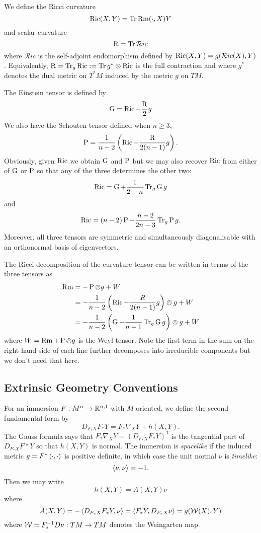 \documentclass[a4paper, 12pt]{amsart}
\begin{document}
We define the Ricci curvature
\[
\operatorname{Ric}(X, Y) = \operatorname{Tr} \operatorname{Rm}(\cdot, X) Y
\]
and scalar curvature
\[
\operatorname{R} = \operatorname{Tr} \mathcal{R}ic
\]
where \(\mathcal{R}ic\) is the self-adjoint endomorphism defined by \(\operatorname{Ric}(X, Y) = g(\mathcal{R}ic(X), Y)\). Equivalently, \(\operatorname{R} = \operatorname{Tr}_g \operatorname{Ric} := \operatorname{Tr} g^{\ast} \otimes \operatorname{Ric}\) is the full contraction and where \(g^{\ast}\) denotes the dual metric on \(T^{\ast}M\) induced by the metric \(g\) on \(TM\).

The Einstein tensor is defined by
\[
\operatorname{G} = \operatorname{Ric} - \frac{\operatorname{R}}{2} g
\]
We also have the Schouten tensor defined when \(n \geq 3\),
\[
\operatorname{P} = \frac{1}{n-2} \left(\operatorname{Ric} - \frac{\operatorname{R}}{2(n-1)}g \right).
\]
Obviously, given \(\operatorname{Ric}\) we obtain \(\operatorname{G}\) and \(\operatorname{P}\) but we may also recover \(\operatorname{Ric}\) from either of \(\operatorname{G}\) or \(\operatorname{P}\) so that any of the three determines the other two:
\[
\operatorname{Ric} = \operatorname{G} + \frac{1}{2-n} \operatorname{Tr}_g \operatorname{G} g
\]
and
\[
\operatorname{Ric} = (n-2) \operatorname{P} + \frac{n-2}{2n-3} \operatorname{Tr}_g \operatorname{P} g.
\]
Moreover, all three tensors are symmetric and simultaneously diagonalisable with an orthonormal basis of eigenvectors.

The Ricci decomposition of the curvature tensor can be written in terms of the three tensors as
\begin{align*}
\operatorname{Rm} &= -\operatorname{P} \owedge g + W \\
&= -\frac{1}{n-2} \left(\operatorname{Ric} - \frac{R}{2(n-1)} g\right) \owedge g + W \\
&= -\frac{1}{n-2} \left(\operatorname{G}  -\frac{1}{n-1} \operatorname{Tr}_g \operatorname{G} g\right) \owedge g + W
\end{align*}
where \(W = \operatorname{Rm} + \operatorname{P} \owedge g\) is the Weyl tensor. Note the first term in the sum on the right hand side of each line further decomposes into irreducible components but we don't need that here.

\subsection{Extrinsic Geometry Conventions}
\label{subsec:notation_extrinsic}

For an immersion \(F : M^n \to \mathbb{R}^{n,1}\) with \(M\) oriented, we define the second fundamental form by
\[
D_{F_{\ast} X} F_{\ast} Y = F_{\ast} \nabla_X Y + h(X, Y).
\]
The Gauss formula says that \(F_{\ast} \nabla_X Y = (D_{F_{\ast} X} F_{\ast} Y)^T\) is the tangential part of \(D_{F_{\ast} X} F{\ast} Y\) so that \(h(X, Y)\) is normal. The immersion is \emph{spacelike} if the induced metric \(g = F^{\ast} \left\langle \cdot,\cdot \right\rangle\) is positive definite, in which case the unit normal \(\nu\) is \emph{timelike}:
\[
\left\langle \nu,\nu \right\rangle = -1.
\]
Then we may write
\[
h(X, Y) = A(X, Y) \nu
\]
where
\[
A(X, Y) = -\left\langle D_{F_{\ast} X} F_{\ast} Y,\nu \right\rangle = \left\langle F_{\ast} Y,D_{F_{\ast} X} \nu \right\rangle = g(\operatorname{\mathcal{W}}(X), Y)
\]
where \(\operatorname{\mathcal{W}} = F_{\ast}^{-1} D\nu: TM \to TM\) denotes the Weingarten map.
\end{document}
